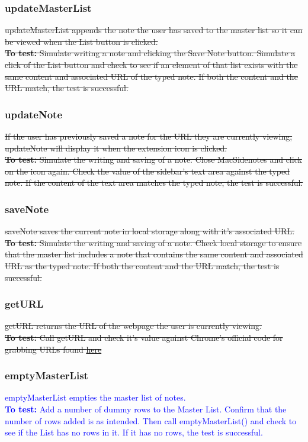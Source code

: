 \documentclass[12pt, titlepage]{article}
\begin{document}
\subsubsection{updateMasterList}
	\sout{updateMasterList appends the note the user has saved to the master 
	list so 
	it can be viewed when the List button is clicked.\\
	\textbf{To test:} Simulate writing a note and clicking the Save Note 
	button. 
	Simulate a click of the List button and check to see if an element of that 
	list exists with the same content and associated URL of the typed note. If 
	both the content and the URL match, the test is successful.}
\subsubsection{updateNote}
	\sout{If the user has previously saved a note for the URL they are 
	currently 
	viewing, updateNote will display it when the extension icon is clicked.\\
	\textbf{To test:} Simulate the writing and saving of a note. Close 
	MacSidenotes and 
	click on the icon again. Check the value of the sidebar's text area against 
	the typed note. If the content of the text area matches the typed note, the 
	test is successful.}
\subsubsection{saveNote}
	\sout{saveNote saves the current note in local storage along with it's 
	associated 
	URL.\\
	\textbf{To test:} Simulate the writing and saving of a note. Check local 
	storage to ensure that the master list includes a note that contains the 
	same content and associated URL as the typed note. If both the content and 
	the URL match, the test is successful.}
\subsubsection{getURL}
	\sout{getURL returns the URL of the webpage the user is currently viewing.\\
	\textbf{To test:} Call getURL and check it's value against Chrome's 
	official code for grabbing URLs found 
	\href{https://developer.chrome.com/extensions/tabs}{here} }
\subsubsection{emptyMasterList}
	\textcolor{blue}{emptyMasterList empties the master list of notes.\\
	\textbf{To test:} Add a number of dummy rows to the Master List. Confirm 
	that the number of rows added is as intended. Then call emptyMasterList() 
	and check to see if the List has no rows in it. If it has no rows, the test 
	is successful.}
\end{document}
